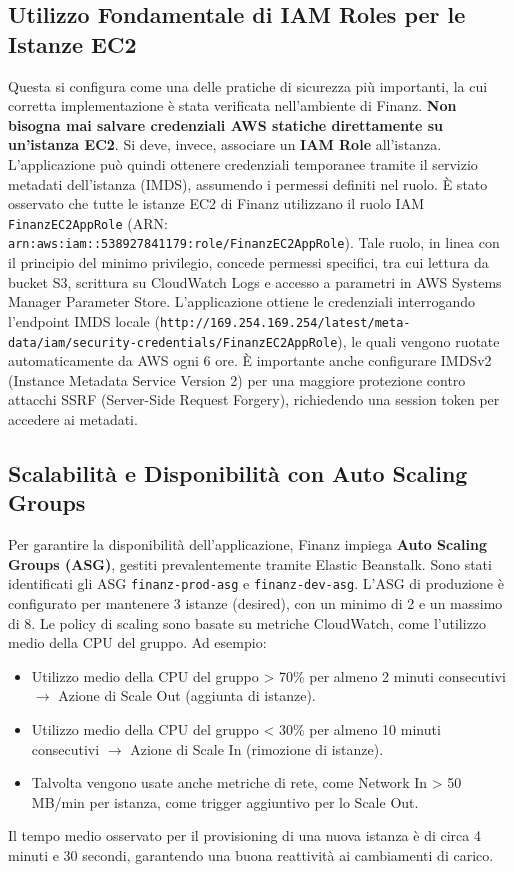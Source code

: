 \subsection{Utilizzo Fondamentale di IAM Roles per le Istanze EC2}
\label{subsec:iam-roles-ec2_cap2}
Questa si configura come una delle pratiche di sicurezza più importanti, la cui corretta implementazione è stata verificata nell'ambiente di Finanz. \textbf{Non bisogna mai salvare credenziali AWS statiche direttamente su un'istanza EC2}. Si deve, invece, associare un \textbf{IAM Role} all'istanza. L'applicazione può quindi ottenere credenziali temporanee tramite il servizio metadati dell'istanza (IMDS), assumendo i permessi definiti nel ruolo.
È stato osservato che tutte le istanze EC2 di Finanz utilizzano il ruolo IAM \texttt{FinanzEC2AppRole} (ARN: \texttt{arn:aws:iam::538927841179:role/FinanzEC2AppRole}). Tale ruolo, in linea con il principio del minimo privilegio, concede permessi specifici, tra cui lettura da bucket S3, scrittura su CloudWatch Logs e accesso a parametri in AWS Systems Manager Parameter Store. L'applicazione ottiene le credenziali interrogando l'endpoint IMDS locale (\texttt{http://169.254.169.254/latest/meta-data/iam/security-credentials/FinanzEC2AppRole}), le quali vengono ruotate automaticamente da AWS ogni 6 ore. È importante anche configurare IMDSv2 (Instance Metadata Service Version 2) per una maggiore protezione contro attacchi SSRF (Server-Side Request Forgery), richiedendo una session token per accedere ai metadati.

\subsection{Scalabilità e Disponibilità con Auto Scaling Groups}
\label{subsec:auto-scaling_cap2}
Per garantire la disponibilità dell'applicazione, Finanz impiega \textbf{Auto Scaling Groups (ASG)}, gestiti prevalentemente tramite Elastic Beanstalk. Sono stati identificati gli ASG \texttt{finanz-prod-asg} e \texttt{finanz-dev-asg}.
L'ASG di produzione è configurato per mantenere 3 istanze (desired), con un minimo di 2 e un massimo di 8. Le policy di scaling sono basate su metriche CloudWatch, come l'utilizzo medio della CPU del gruppo. Ad esempio:
\begin{itemize}
    \item Utilizzo medio della CPU del gruppo > 70\% per almeno 2 minuti consecutivi $\rightarrow$ Azione di Scale Out (aggiunta di istanze).
    \item Utilizzo medio della CPU del gruppo < 30\% per almeno 10 minuti consecutivi $\rightarrow$ Azione di Scale In (rimozione di istanze).
    \item Talvolta vengono usate anche metriche di rete, come Network In > 50 MB/min per istanza, come trigger aggiuntivo per lo Scale Out.
\end{itemize}
Il tempo medio osservato per il provisioning di una nuova istanza è di circa 4 minuti e 30 secondi, garantendo una buona reattività ai cambiamenti di carico.

